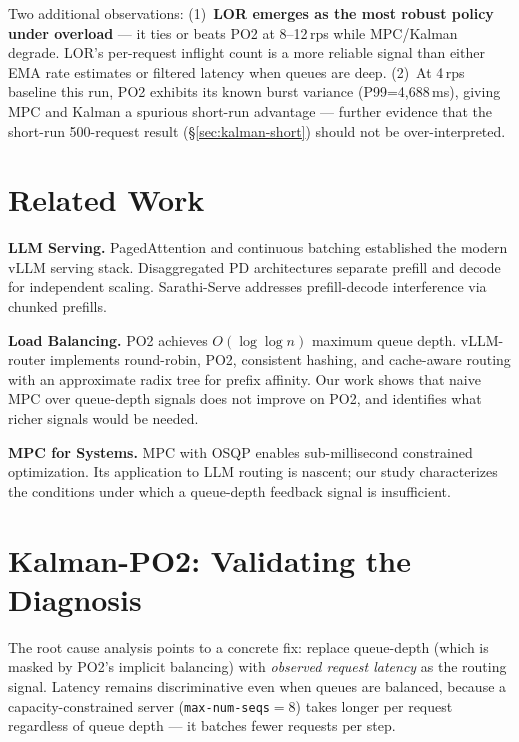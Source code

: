 \documentclass[blind]{gtac}
\begin{document}
Two additional observations: (1)~\textbf{LOR emerges as the most
robust policy under overload} --- it ties or beats PO2 at 8--12\,rps
while MPC/Kalman degrade. LOR's per-request inflight count is a more
reliable signal than either EMA rate estimates or filtered latency when
queues are deep. (2)~At 4\,rps baseline this run, PO2 exhibits its
known burst variance (P99=4,688\,ms), giving MPC and Kalman a
spurious short-run advantage --- further evidence that the short-run
500-request result (\S\ref{sec:kalman-short}) should not be
over-interpreted.

\section{Related Work}

\textbf{LLM Serving.}
PagedAttention \cite{vllm} and continuous batching \cite{orca} established
the modern vLLM serving stack. Disaggregated PD architectures
\cite{splitwise,distserve,mooncake} separate prefill and decode for
independent scaling. Sarathi-Serve \cite{sarathi} addresses prefill-decode
interference via chunked prefills.

\textbf{Load Balancing.}
PO2 \cite{po2} achieves $O(\log \log n)$ maximum queue depth.
vLLM-router \cite{vllm_router} implements round-robin, PO2, consistent
hashing, and cache-aware routing with an approximate radix tree for prefix
affinity. Our work shows that naive MPC over queue-depth signals does not
improve on PO2, and identifies what richer signals would be needed.

\textbf{MPC for Systems.}
MPC \cite{mpc_book} with OSQP \cite{osqp} enables sub-millisecond
constrained optimization. Its application to LLM routing is nascent;
our study characterizes the conditions under which a queue-depth feedback
signal is insufficient.

\section{Kalman-PO2: Validating the Diagnosis}
\label{sec:kalman}

The root cause analysis points to a concrete fix: replace queue-depth
(which is masked by PO2's implicit balancing) with \emph{observed
request latency} as the routing signal. Latency remains discriminative
even when queues are balanced, because a capacity-constrained server
(\texttt{max-num-seqs}$=8$) takes longer per request regardless of
queue depth --- it batches fewer requests per step.
\end{document}
